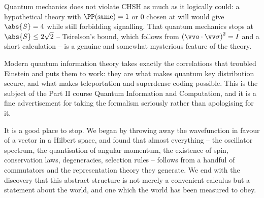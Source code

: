 \begin{remark}
    Quantum mechanics does not violate CHSH as much as it logically could: a hypothetical theory with $\PP(\text{same}) = 1$ or $0$ chosen at will would give $\abs{S} = 4$ while still forbidding signalling. That quantum mechanics stops at $\abs{S}\leq2\sqrt2$ -- Tsirelson's bound, which follows from $\left(\vv a\cdot\vv\sigma\right)^2 = I$ and a short calculation -- is a genuine and somewhat mysterious feature of the theory.
\end{remark}

\begin{remark}
    Modern quantum information theory takes exactly the correlations that troubled Einstein and puts them to work: they are what makes quantum key distribution secure, and what makes teleportation and superdense coding possible. This is the subject of the Part II course Quantum Information and Computation, and it is a fine advertisement for taking the formalism seriously rather than apologising for it.
\end{remark}

It is a good place to stop. We began by throwing away the wavefunction in favour of a vector in a Hilbert space, and found that almost everything -- the oscillator spectrum, the quantisation of angular momentum, the existence of spin, conservation laws, degeneracies, selection rules -- follows from a handful of commutators and the representation theory they generate. We end with the discovery that this abstract structure is not merely a convenient calculus but a statement about the world, and one which the world has been measured to obey.

